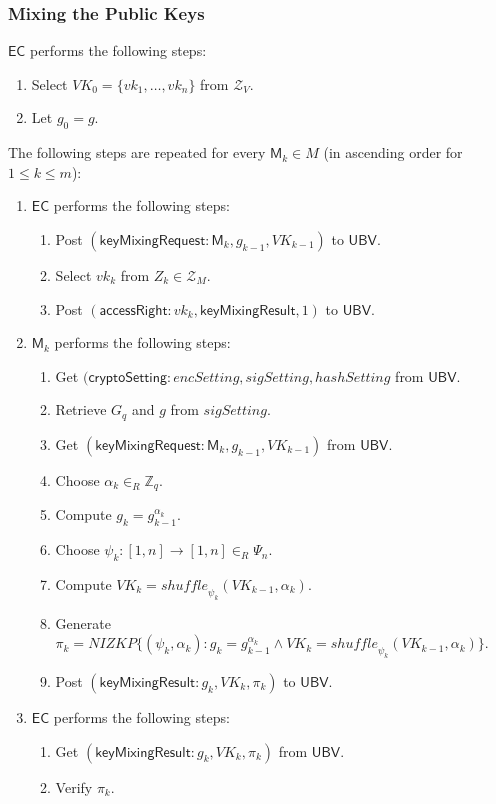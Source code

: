 \documentclass[bibtotoc,halfparskip,oneside]{scrreprt}
\newcommand{\vk}[1]{\mathit{vk}_{#1}\xspace}
\newcommand{\EC}{\ensuremath{\mathsf{EC}}\xspace}
\newcommand{\UBV}{\ensuremath{\mathsf{UBV}}\xspace}
\newcommand{\Mixer}[1]{\ensuremath{\mathsf{M}_{#1}}\xspace}
\begin{document}
	\subsubsection{Mixing the Public Keys}
	\EC performs the following steps:
	\begin{enumerate}
		\item Select $\mathit{VK}_0=\{\vk{1},\ldots,\vk{n}\}$ from $\mathcal{Z}_V$.
		\item Let $g_0=g$.
	\end{enumerate}
	The following steps are repeated for every $\Mixer{k}\in M$ (in ascending order for $1\leq k\leq m$):
	\begin{enumerate}[resume]
		\item \EC performs the following steps:
		\begin{enumerate}
			\item Post $(\mathsf{keyMixingRequest}:\Mixer{k},g_{k-1}, \mathit{VK}_{k-1})$ to \UBV.
			\item Select $\vk{k}$ from $Z_{k}\in \mathcal{Z}_{M}$.
			\item Post $(\mathsf{accessRight}:\vk{k},\mathsf{keyMixingResult},1)$ to \UBV.
		\end{enumerate}
		\item $\Mixer{k}$ performs the following steps:
		\begin{enumerate}
			\item Get $(\mathsf{cryptoSetting}:\mathit{encSetting},\mathit{sigSetting},\mathit{hashSetting}$ from \UBV.
			\item Retrieve $G_q$ and $g$ from $\mathit{sigSetting}$.
			\item Get $(\mathsf{keyMixingRequest}:\Mixer{k}, g_{k-1}, \mathit{VK}_{k-1})$ from \UBV.
			\item Choose $\alpha_k\in_R\mathbb{Z}_q$.
			\item Compute $g_k = g_{k-1}^{\alpha_k}$.
			\item Choose $\psi_k:[1,n]\rightarrow[1,n]\in_R\Psi_n$.
			\item Compute $\mathit{VK}_k=\mathit{shuffle}_{\psi_k}(\mathit{VK}_{k-1},\alpha_k)$.
			\item Generate $\pi_{k}=\mathit{NIZKP}\{(\psi_k,\alpha_k):g_k=g_{k-1}^{\alpha_k}\wedge \mathit{VK}_{k}=\mathit{shuffle}_{\psi_k}(\mathit{VK}_{k-1},\alpha_k)\}$.
			\item Post $(\mathsf{keyMixingResult}:g_k,\mathit{VK}_k,\pi_{k})$ to \UBV.
		\end{enumerate}
		\item \EC performs the following steps:
		\begin{enumerate}
			\item Get $(\mathsf{keyMixingResult}:g_k,\mathit{VK}_k,\pi_{k})$ from \UBV.
			\item Verify $\pi_{k}$.
		\end{enumerate}
	\end{enumerate}
	
\end{document}
